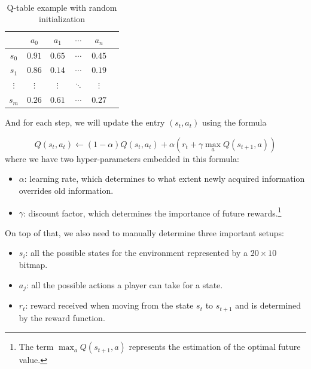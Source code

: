 \documentclass[letterpaper]{article} %
\begin{document}
$\,$
\begin{table}[h!]
  \centering
  \normalsize{
    \begin{tabular}{ |c|c|c|c|c|c| } 
      \hline
       & $a_{0}$ & $a_{1}$ & $\cdots$ & $a_{n}$  \\ 
      \hline
       $s_{0}$ & $0.91$ & $0.65$ &$\cdots $ &$0.45$  \\ 
       \hline
       $s_{1}$ & $0.86$ & $0.14$ &$\cdots $ &$0.19$  \\ 
       \hline
       $\vdots$ & $\vdots$ & $\vdots$ &$\ddots $ &$\vdots$  \\ 
       \hline
       $s_{m}$ & $0.26$ & $0.61$ &$\cdots $ &$0.27$  \\ 
       \hline
      \end{tabular}}
  \caption{Q-table example with random initialization}
  \label{tab:qtable}
\end{table}

And for each step, we will update the entry $(s_{t}, a_{t})$ using the formula

\[
    Q(s_{t},a_{t}) \leftarrow (1-\alpha) Q(s_{t},a_{t}) + \alpha   \left ( r_{t} + \gamma  \max_{a}Q(s_{t+1}, a)\right ) 
\]
where we have two hyper-parameters embedded in this formula:
\begin{itemize}
  \item $\alpha$: learning rate, which determines to what extent newly acquired information overrides old information.
  \item $\gamma$: discount factor, which determines the importance of future rewards.\footnote{The term $\max_{a}Q(s_{t+1}, a) $ represents the estimation of the optimal future value.}
\end{itemize}

On top of that, we also need to manually determine three important setups:
\begin{itemize}
  \item $s_{i}$: all the possible states for the environment represented by a $20\times 10$ bitmap.
  \item $a_{j}$: all the possible actions a player can take for a state.
  \item $r_{t}$: reward received when moving from the state $s_{t}$ to $s_{t+1}$ and is determined by the reward function.
\end{itemize}
\end{document}
